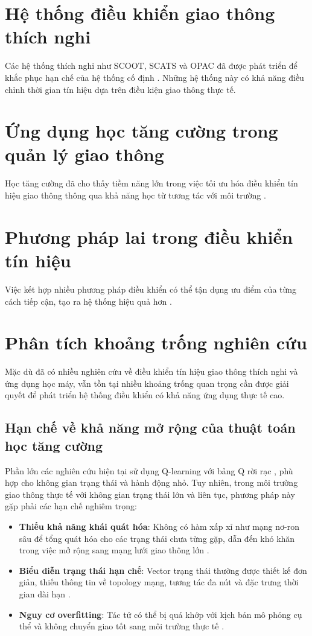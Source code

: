 \section{Hệ thống điều khiển giao thông thích nghi}
Các hệ thống thích nghi như SCOOT, SCATS và OPAC đã được phát triển để khắc phục hạn chế của hệ thống cố định \cite{Eom2020}. Những hệ thống này có khả năng điều chỉnh thời gian tín hiệu dựa trên điều kiện giao thông thực tế.

\section{Ứng dụng học tăng cường trong quản lý giao thông}
Học tăng cường đã cho thấy tiềm năng lớn trong việc tối ưu hóa điều khiển tín hiệu giao thông thông qua khả năng học từ tương tác với môi trường \cite{Eom2020}.

\section{Phương pháp lai trong điều khiển tín hiệu}
Việc kết hợp nhiều phương pháp điều khiển có thể tận dụng ưu điểm của từng cách tiếp cận, tạo ra hệ thống hiệu quả hơn \cite{Eom2020}.

\section{Phân tích khoảng trống nghiên cứu}

Mặc dù đã có nhiều nghiên cứu về điều khiển tín hiệu giao thông thích nghi và ứng dụng học máy, vẫn tồn tại nhiều khoảng trống quan trọng cần được giải quyết để phát triển hệ thống điều khiển có khả năng ứng dụng thực tế cao.

\subsection{Hạn chế về khả năng mở rộng của thuật toán học tăng cường}

Phần lớn các nghiên cứu hiện tại sử dụng Q-learning với bảng Q rời rạc \cite{Watkins1992, Mannion2016}, phù hợp cho không gian trạng thái và hành động nhỏ. Tuy nhiên, trong môi trường giao thông thực tế với không gian trạng thái lớn và liên tục, phương pháp này gặp phải các hạn chế nghiêm trọng:

\begin{itemize}
    \item \textbf{Thiếu khả năng khái quát hóa}: Không có hàm xấp xỉ như mạng nơ-ron sâu để tổng quát hóa cho các trạng thái chưa từng gặp, dẫn đến khó khăn trong việc mở rộng sang mạng lưới giao thông lớn \cite{Li2016, Liang2019}.
    
    \item \textbf{Biểu diễn trạng thái hạn chế}: Vector trạng thái thường được thiết kế đơn giản, thiếu thông tin về topology mạng, tương tác đa nút và đặc trưng thời gian dài hạn \cite{Wei2019}.
    
    \item \textbf{Nguy cơ overfitting}: Tác tử có thể bị quá khớp với kịch bản mô phỏng cụ thể và không chuyển giao tốt sang môi trường thực tế \cite{Gao2017}.
\end{itemize}

